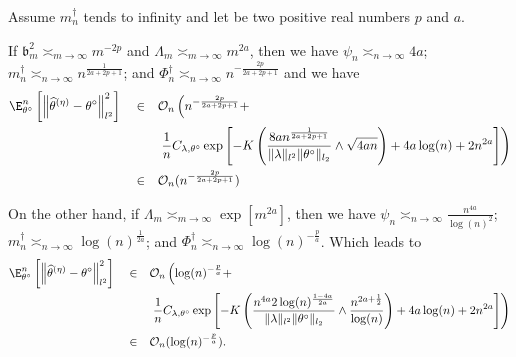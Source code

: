 \begin{il}\label{IL_FREQ_CIRCDECONV_KNOWN_IID_ORACLE_NP}
Assume $m^{\dagger}_{n}$ tends to infinity and let be two positive real numbers $p$ and $a$.

If $\mathfrak{b}_{m}^{2} \asymp_{m \rightarrow \infty} m^{-2p}$ and $\Lambda_{m} \asymp_{m \rightarrow \infty} m^{2a}$, then we have $\psi_{n} \asymp_{n \rightarrow \infty} 4a$; $m^{\dagger}_{n} \asymp_{n \rightarrow \infty} n^{\frac{1}{2a + 2p + 1}}$; and $\Phi^{\dagger}_{n} \asymp_{n \rightarrow \infty} n^{-\frac{2p}{2a + 2p + 1}}$ and we have
\begin{alignat*}{3}
& \E_{\theta^{\circ}}^{n}\left[\left\Vert \widehat{\theta}^{(\eta)} - \theta^{\circ} \right\Vert_{l^{2}}^{2}\right] && \in && \mathcal{O}_{n}\left(n^{-\frac{2p}{2a + 2p + 1}} +\right.\\
& && && \left. \frac{1}{n} C_{\lambda, \theta^{\circ}} \exp\left[- K \left(\frac{8 a n^{\frac{1}{2a + 2p + 1}}}{\Vert \lambda \Vert_{l^{2}} \Vert \theta^{\circ} \Vert_{l_{2}}} \wedge \sqrt{4 a n}\right) + 4 a \log(n) + 2 n^{2a} \right]\right)\\
& && \in && \mathcal{O}_{n}(n^{-\frac{2p}{2a + 2p + 1}})
\end{alignat*}

\medskip

On the other hand, if $\Lambda_{m} \asymp_{m \rightarrow \infty} \exp\left[m^{2a}\right]$, then we have $\psi_{n} \asymp_{n \rightarrow \infty} \frac{n^{4a}}{\log(n)^{2}}$; $m^{\dagger}_{n} \asymp_{n \rightarrow \infty} \log(n)^{\frac{1}{2a}}$; and $\Phi^{\dagger}_{n} \asymp_{n \rightarrow \infty} \log(n)^{-\frac{p}{a}}$.
Which leads to
\begin{alignat*}{3}
& \E_{\theta^{\circ}}^{n}\left[\left\Vert \widehat{\theta}^{(\eta)} - \theta^{\circ} \right\Vert_{l^{2}}^{2}\right] && \in && \mathcal{O}_{n}\left(\log(n)^{-\frac{p}{a}} + \right. \\
& && && \left. \frac{1}{n} C_{\lambda, \theta^{\circ}} \exp\left[- K \left(\frac{n^{4a} 2 \log(n)^{\frac{1 - 4a}{2a}}}{\Vert \lambda \Vert_{l^{2}} \Vert \theta^{\circ} \Vert_{l_{2}}} \wedge \frac{n^{2a + \frac{1}{2}}}{\log(n)}\right) + 4 a \log(n) + 2 n^{2a} \right]\right)\\
& && \in && \mathcal{O}_{n}(\log(n)^{-\frac{p}{a}}).
\end{alignat*}
\end{il}